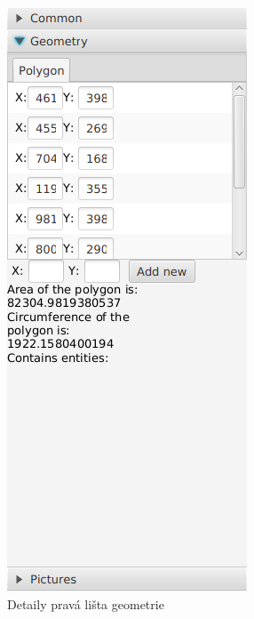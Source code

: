 \documentclass[12pt,a4paper,titlepage]{article}
\begin{document}
\begin{figure}[!htbp]
	\centering
	\includegraphics[scale=0.4]{right_bar2}
	\caption{Detaily pravá lišta geometrie}
	\label{rightBar}
\end{figure}
\end{document}

